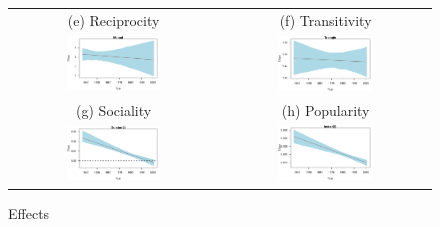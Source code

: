 \documentclass[headsepline=true, abstracton]{scrartcl}
\begin{document}
\begin{figure}[H]
\begin{tabular}{cc}
   (e) Reciprocity & (f) Transitivity \\
\includegraphics[width = 0.475\textwidth, trim= 0.1cm 1cm 0.5cm .45cm,clip=true]{images/mutual_coef_trend.pdf} & \includegraphics[width = 0.475\textwidth, trim= 0.1cm 1cm 0.5cm .45cm,clip=true]{images/triangle_coef_trend.pdf} \\
 
    (g) Sociality & (h) Popularity \\
\includegraphics[width = 0.475\textwidth, trim= 0.1cm 1cm 0.5cm .45cm,clip=true]{images/o2star_coef_trend.pdf} & \includegraphics[width = 0.475\textwidth, trim= 0.1cm 1cm 0.5cm .45cm,clip=true]{images/i2star_coef_trend.pdf} \\
 
 
\end{tabular}
\caption{Effects}
 \label{fig:coeftrends}
\vspace{-.25cm}
\end{figure} 
\end{document}
